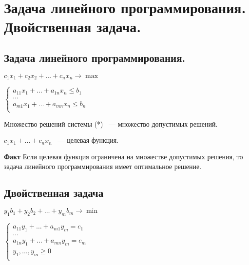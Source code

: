 \documentclass[12pt]{article}
\begin{document}
\section{Задача линейного программирования. Двойственная задача.}

\subsection{Задача линейного программирования.}

$c_1 x_1 + c_2 x_2 + \ldots + c_n x_n \to \max$

$\begin{cases} a_{11}x_1 + \ldots + a_{1n}x_n \le b_1\\ \ldots \\  a_{m1}x_1 + \ldots + a_{mn}x_n \le b_n\\ \end{cases}$

Множество решений системы (*) ~--- множество допустимых решений.

$c_1 x_1 + \ldots + c_n x_n$ ~--- целевая функция.

{\bf Факт} Если целевая функция ограничена на множестве допустимых решения, то задача линейного программирования имеет оптимальное решение. 

\subsection{Двойственная задача}

$y_1 b_1 + y_2 b_2 + \ldots + y_m b_m \to \min$

$\begin{cases} a_{11}y_1 + \ldots + a_{m1}y_m = c_1\\ \ldots \\  a_{1n}y_1 + \ldots + a_{mn}y_m = c_m\\ y_1, \ldots, y_m \ge 0 \\ \end{cases}$
\end{document}
